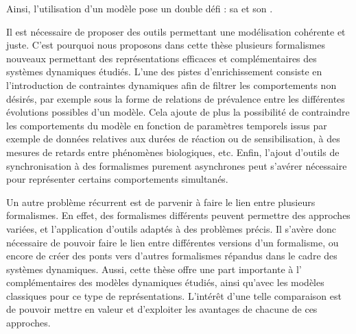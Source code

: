 Ainsi, l'utilisation d'un modèle pose un double défi :
sa  et son .

Il est nécessaire de proposer des outils permettant une modélisation cohérente et juste.
C'est pourquoi nous proposons dans cette thèse plusieurs formalismes nouveaux permettant
des représentations efficaces et complémentaires des systèmes dynamiques étudiés.
L'une des pistes d'enrichissement consiste
en l'introduction de contraintes dynamiques afin de filtrer les comportements non désirés,
par exemple sous la forme 
de relations de prévalence entre les différentes évolutions possibles d'un modèle.
Cela ajoute de plus la possibilité de contraindre les comportements du modèle
en fonction de paramètres temporels issus
par exemple de données relatives aux durées de réaction ou de sensibilisation,
à des mesures de retards entre phénomènes biologiques, etc.
Enfin, l'ajout d'outils de synchronisation à des formalismes purement asynchrones
peut s'avérer nécessaire pour représenter certains comportements simultanés.


Un autre problème récurrent est de parvenir à faire le lien entre plusieurs formalismes.
En effet, des formalismes différents peuvent permettre des approches variées,
et l'application d'outils adaptés à des problèmes précis.
Il s'avère donc nécessaire de pouvoir faire le lien entre différentes versions
d'un formalisme, ou encore de créer des ponts vers d'autres formalismes répandus
dans le cadre des systèmes dynamiques.
Aussi, cette thèse offre une part importante à l' complémentaires des modèles dynamiques étudiés,
ainsi qu'avec les modèles classiques pour ce type de représentations.
L'intérêt d'une telle comparaison est de pouvoir mettre en valeur et d'exploiter
les avantages de chacune de ces approches.

